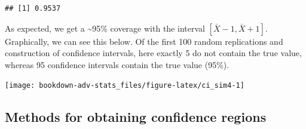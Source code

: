\documentclass[
]{book}
\newenvironment{Shaded}{\begin{snugshade}}{\end{snugshade}}
\newcommand{\AttributeTok}[1]{\textcolor[rgb]{0.77,0.63,0.00}{#1}}
\newcommand{\CommentTok}[1]{\textcolor[rgb]{0.56,0.35,0.01}{\textit{#1}}}
\newcommand{\ConstantTok}[1]{\textcolor[rgb]{0.00,0.00,0.00}{#1}}
\newcommand{\ControlFlowTok}[1]{\textcolor[rgb]{0.13,0.29,0.53}{\textbf{#1}}}
\newcommand{\DecValTok}[1]{\textcolor[rgb]{0.00,0.00,0.81}{#1}}
\newcommand{\FunctionTok}[1]{\textcolor[rgb]{0.00,0.00,0.00}{#1}}
\newcommand{\NormalTok}[1]{#1}
\newcommand{\OtherTok}[1]{\textcolor[rgb]{0.56,0.35,0.01}{#1}}
\newcommand{\SpecialCharTok}[1]{\textcolor[rgb]{0.00,0.00,0.00}{#1}}
\theoremstyle{definition}
\theoremstyle{definition}
\theoremstyle{definition}
\theoremstyle{definition}
\theoremstyle{remark}
\begin{document}
\begin{Shaded}
\end{Shaded}

\begin{verbatim}
## [1] 0.9537
\end{verbatim}

As expected, we get a \textasciitilde95\% coverage with the interval \([\bar X - 1, \bar X + 1]\).
Graphically, we can see this below.
Of the first 100 random replications and construction of confidence intervals, here exactly 5 do not contain the true value, whereas 95 confidence intervals contain the true value (95\%).

\begin{center}\texttt{[image: bookdown-adv-stats\_files/figure-latex/ci\_sim4-1]} \end{center}

\hypertarget{methods-for-obtaining-confidence-regions}{%
\subsection{Methods for obtaining confidence regions}\label{methods-for-obtaining-confidence-regions}}
\end{document}
